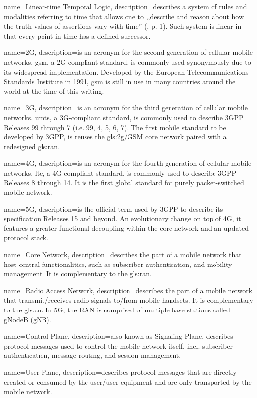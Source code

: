 {
    name={Linear-time Temporal Logic},
    description={describes a system of rules and modalities referring to time that allows one to ,,describe and reason about how the truth values of assertions vary
with time'' (\cite{emerson1990temporal}, p. 1). Such system is linear in that every point in time has a defined successor.}
}

{
    name={2G},
    description={is an acronym for the second generation of cellular mobile networks. \gls{gsm}, a 2G-compliant standard, is commonly used synonymously due to its widespread implementation. Developed by the European Telecommunications Standards Institute in 1991, \gls{gsm} is still in use in many countries around the world at the time of this writing.}
}

{
    name={3G},
    description={is an acronym for the third generation of cellular mobile networks. \gls{umts}, a 3G-compliant standard, is commonly used to describe 3GPP Releases 99 through 7 (i.e. 99, 4, 5, 6, 7). The first mobile standard to be developed by 3GPP, is reuses the \gls{gls:2g}/GSM core network paired with a redesigned \gls{gls:ran}.}
}

{
    name={4G},
    description={is an acronym for the fourth generation of cellular mobile networks. \gls{lte}, a 4G-compliant standard, is commonly used to describe 3GPP Releases 8 through 14. It is the first global standard for purely packet-switched mobile network.}
}

{
    name={5G},
    description={is the official term used by 3GPP to describe its specification Releases 15 and beyond. An evolutionary change on top of 4G, it features a greater functional decoupling within the core network and an updated protocol stack.}
}

{
    name={Core Network},
    description={describes the part of a mobile network that host central functionalities, such as subscriber authentication, and mobility management. It is complementary to the \gls{gls:ran}.}
}

{
    name={Radio Access Network},
    description={describes the part of a mobile network that transmit/receives radio signals to/from mobile handsets. It is complementary to the \gls{gls:cn}. In 5G, the RAN is comprised of multiple base stations called gNodeB (gNB).}
}

{
    name={Control Plane},
    description={also known as Signaling Plane, describes protocol messages used to control the mobile network itself, incl. subscriber authentication, message routing, and session management.}
}

{
    name={User Plane},
    description={describes protocol messages that are directly created or consumed by the user/user equipment and are only transported by the mobile network.}
}